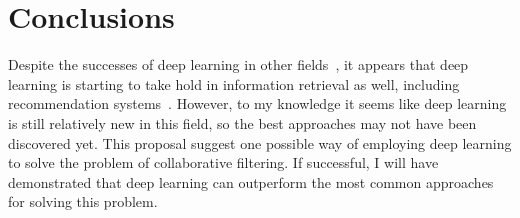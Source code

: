 \documentclass[12pt]{article}
\begin{document}
\section{Conclusions}

Despite the successes of deep learning in other fields~\cite{deep-survey},
it appears that deep learning is starting to take hold in information
retrieval as well, including recommendation systems~\cite{deep-cf}.
However, to my knowledge it seems like deep learning is still relatively new
in this field, so the best approaches may not have been discovered yet.
This proposal suggest one possible way of employing deep learning to solve the
problem of collaborative filtering.
If successful, I will have demonstrated that deep learning can outperform the
most common approaches for solving this problem.



\end{document}
